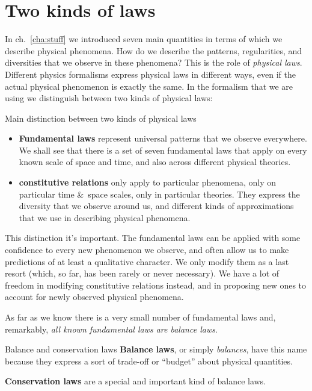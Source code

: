 \documentclass[a4paper,12pt,%
onecolumn,oneside,titlepage,%
british%
]{memoir}
\newcommand*{\amp}{\&}
\renewcommand*{\|}[1][]{\nonscript\:#1\vert\nonscript\:\mathopen{}}
\newcommand*{\chap}{ch.}%
\begin{document}
\section{Two kinds of laws}
\label{sec:two_kinds}

In \chap~\ref{cha:stuff} we introduced seven main quantities in terms of which we describe physical phenomena. How do we describe the patterns, regularities, and diversities that we observe in these phenomena? This is the role of \emph{physical laws}. Different physics formalisms express physical laws in different ways, even if the actual physical phenomenon is exactly the same. In the formalism that we are using we distinguish between two kinds of physical laws:
\begin{definition}{Main distinction between two kinds of physical laws}
  \begin{itemize}
  \item\textbf{Fundamental laws} represent universal patterns that we observe everywhere. We shall see that there is a set of seven fundamental laws that apply on every known scale of space and time, and also across different physical theories.

\item\textbf{constitutive relations}  only apply to particular phenomena, only on particular time \amp\ space scales, only in particular theories. They express the diversity that we observe around us, and different kinds of approximations that we use in describing physical phenomena.
  \end{itemize}
\end{definition}

This distinction it's important. The fundamental laws can be applied with some confidence to every new phenomenon we observe, and often allow us to make predictions of at least a qualitative character. We only modify them as a last resort (which, so far, has been rarely or never necessary). We have a lot of freedom in modifying constitutive relations instead, and in proposing new ones to account for newly observed physical phenomena.

\medskip

As far as we know there is a very small number of fundamental laws and, remarkably, \emph{all known fundamental laws are balance laws}.
\begin{definition}{Balance and conservation laws}
  \textbf{Balance laws}, or simply \emph{balances}, have this name because they express a sort of trade-off or \enquote{budget} about physical quantities.

  \textbf{Conservation laws} are a special and important kind of balance laws.
\end{definition}
\end{document}
